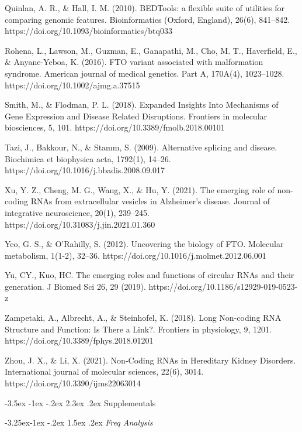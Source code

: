 \documentclass[11pt]{article}
\makeatletter
\renewcommand\section{\@startsection {section}{1}{\z@}%
                                       {-3.5ex \@plus -1ex \@minus -.2ex}%
                                       {2.3ex \@plus.2ex}%
                                       {\normalfont\fontfamily{phv}\fontsize{16}{19}\bfseries}}
\renewcommand\subsection{\@startsection{subsection}{2}{\z@}%
                                         {-3.25ex\@plus -1ex \@minus -.2ex}%
                                         {1.5ex \@plus .2ex}%
                                         {\normalfont\fontfamily{phv}\fontsize{14}{17}\bfseries}}
\makeatother
\begin{document}
Quinlan, A. R., & Hall, I. M. (2010). BEDTools: a flexible suite of utilities for comparing genomic features. Bioinformatics (Oxford, England), 26(6), 841–842. https://doi.org/10.1093/bioinformatics/btq033 

Rohena, L., Lawson, M., Guzman, E., Ganapathi, M., Cho, M. T., Haverfield, E., & Anyane-Yeboa, K. (2016). FTO variant associated with malformation syndrome. American journal of medical genetics. Part A, 170A(4), 1023–1028. https://doi.org/10.1002/ajmg.a.37515 

Smith, M., & Flodman, P. L. (2018). Expanded Insights Into Mechanisms of Gene Expression and Disease Related Disruptions. Frontiers in molecular biosciences, 5, 101. https://doi.org/10.3389/fmolb.2018.00101 

Tazi, J., Bakkour, N., & Stamm, S. (2009). Alternative splicing and disease. Biochimica et biophysica acta, 1792(1), 14–26. https://doi.org/10.1016/j.bbadis.2008.09.017 

Xu, Y. Z., Cheng, M. G., Wang, X., & Hu, Y. (2021). The emerging role of non-coding RNAs from extracellular vesicles in Alzheimer's disease. Journal of integrative neuroscience, 20(1), 239–245. https://doi.org/10.31083/j.jin.2021.01.360 

Yeo, G. S., & O'Rahilly, S. (2012). Uncovering the biology of FTO. Molecular metabolism, 1(1-2), 32–36. https://doi.org/10.1016/j.molmet.2012.06.001 

Yu, CY., Kuo, HC. The emerging roles and functions of circular RNAs and their generation. J Biomed Sci 26, 29 (2019). https://doi.org/10.1186/s12929-019-0523-z 

Zampetaki, A., Albrecht, A., & Steinhofel, K. (2018). Long Non-coding RNA Structure and Function: Is There a Link?. Frontiers in physiology, 9, 1201. https://doi.org/10.3389/fphys.2018.01201 

Zhou, J. X., & Li, X. (2021). Non-Coding RNAs in Hereditary Kidney Disorders. International journal of molecular sciences, 22(6), 3014. https://doi.org/10.3390/ijms22063014 

 



\section{Supplementals} \label{s:supplementals}

\subsection{
\emph{Freq Analysis}} \label{s:conclusion}
\end{document}
